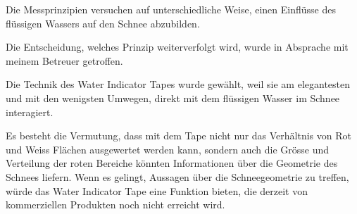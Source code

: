Die Messprinzipien versuchen auf unterschiedliche Weise, einen Einflüsse des flüssigen Wassers auf den Schnee abzubilden.

Die Entscheidung, welches Prinzip weiterverfolgt wird, wurde in Absprache mit meinem Betreuer getroffen.

Die Technik des Water Indicator Tapes wurde gewählt, weil sie am elegantesten und mit den wenigsten Umwegen, direkt mit dem flüssigen Wasser im Schnee interagiert.

Es besteht die Vermutung, dass mit dem Tape nicht nur das Verhältnis von Rot und Weiss Flächen ausgewertet werden kann, sondern auch die Grösse und Verteilung der roten Bereiche könnten Informationen über die Geometrie des Schnees liefern. Wenn es gelingt, Aussagen über die Schneegeometrie zu treffen, würde das Water Indicator Tape eine Funktion bieten, die derzeit von kommerziellen Produkten noch nicht erreicht wird.
